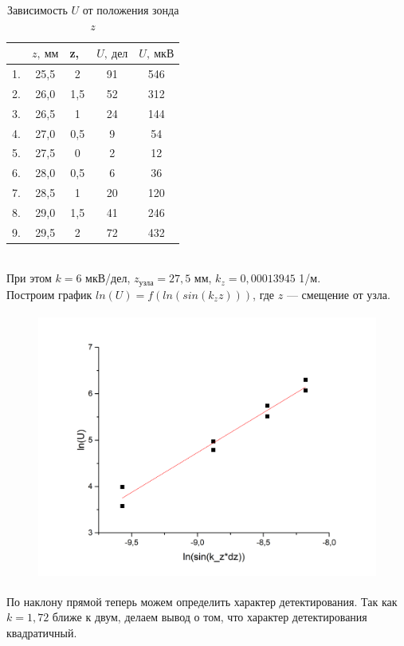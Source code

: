 \documentclass[a4paper,12pt]{article}
\begin{document}
\begin{table}[H]
    \centering
	\begin{tabular}{|c|c|c|c|c|}
		\hline
		\text{№} & $z,\ \text{мм}$ & \Delta z,\ \text{мм} & $U,\ \text{дел}$ &  $U,\ \text{мкВ}$ \\
		\hline
		1.  & 25,5 & 2 & 91 & 546 \\
		2.  & 26,0 & 1,5 & 52 & 312 \\
		3.  & 26,5 & 1 & 24 & 144 \\
		4.  & 27,0 & 0,5& 9  & 54 \\
		5.  & 27,5 & 0& 2  & 12 \\
		6.  & 28,0 & 0,5& 6  & 36 \\
		7.  & 28,5 & 1& 20 & 120 \\
		8.  & 29,0 & 1,5& 41 & 246 \\
		9.  & 29,5 &2& 72 & 432 \\
		\hline
	\end{tabular}
 \caption{Зависимость $U$ от положения зонда $z$}
\end{table}\\

При этом $k = 6$ мкВ/дел, $z_{\text{узла}} = 27,5$ мм, $k_z = 0,00013945$ 1/м.\\

Построим график $ln(U) = f(ln(sin(k_zz)))$, где $z$ --- смещение от узла.

\begin{figure}[H]
    \centering
    \includegraphics[width=13.5cm, height=8.8cm]{images/graph2.png}
\end{figure}

По наклону прямой теперь можем определить характер детектирования. Так как $k = 1,72$ ближе к двум, делаем вывод о том, что характер детектирования квадратичный.\\\\
\end{document}
